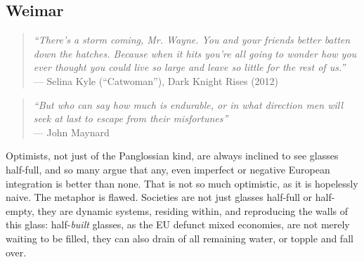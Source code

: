 \documentclass[11pt,a4paper,oneside,openright]{article}
\begin{document}



\subsection[Weimar]{Weimar}

\begin{quote}
	\emph{``There’s a storm coming, Mr. Wayne. You and your friends better batten down the hatches. Because when it hits you’re all going to wonder how you ever thought you could live so large and leave so little for the rest of us.''}\\
	--- Selina Kyle (``Catwoman''), Dark Knight Rises (2012)
\end{quote}

\begin{quote}
	\emph{``But who can say how much is endurable, or in what direction men will seek at last to escape from their misfortunes''}\\
	--- John Maynard \cite{Keynes1936}
\end{quote}

Optimists, not just of the Panglossian kind, are always inclined to see glasses half-full, and so many argue that any, even imperfect or negative European integration is better than none.  That is not so much optimistic, as it is hopelessly naive. The metaphor is flawed. Societies are not just glasses half-full or half-empty, they are dynamic systems, residing within, and reproducing the walls of this glass: half-\emph{built} glasses, as the \gls{EU} defunct mixed economies, are not merely waiting to be filled, they can also drain of all remaining water, or topple and fall over.
\end{document}

